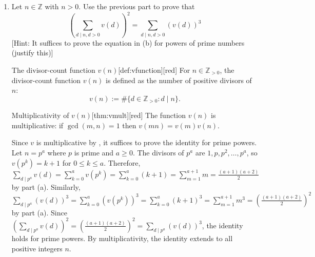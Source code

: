 \begin{enumerate}
\begin{enumerate}
    \item Let $n \in \mathbb{Z}$ with $n>0$. Use the previous part to prove that
    $$
    \left(\sum_{d \mid n, d>0} v(d)\right)^2=\sum_{d \mid n, d>0}(v(d))^3
    $$
    [Hint: It suffices to prove the equation in (b) for powers of prime numbers (justify this)]
    \begin{define}{The divisor-count function $v(n)$}[def:vfunction][red]
    For $n\in\mathbb{Z}_{>0}$, the divisor-count function $v(n)$ is defined as the number of positive divisors of $n$:
    \[
    v(n):=\#\{d\in\mathbb{Z}_{>0}:d\mid n\}.
    \]
    \end{define}
    \begin{define}{Multiplicativity of $v(n)$}[thm:vmult][red]
    The function $v(n)$ is multiplicative: if $\gcd(m,n)=1$ then $v(mn)=v(m)v(n)$.
    \end{define}
    \begin{subprove}
      Since $v$ is multiplicative by , it suffices to prove the identity for prime powers.
      Let $n=p^a$ where $p$ is prime and $a\geq 0$. The divisors of $p^a$ are $1,p,p^2,\ldots,p^a$, so $v(p^k)=k+1$ for $0\leq k\leq a$.
      Therefore, $\sum_{d\mid p^a} v(d) = \sum_{k=0}^a v(p^k) = \sum_{k=0}^a (k+1) = \sum_{m=1}^{a+1} m = \frac{(a+1)(a+2)}{2}$ by part (a).
      Similarly, $\sum_{d\mid p^a} (v(d))^3 = \sum_{k=0}^a (v(p^k))^3 = \sum_{k=0}^a (k+1)^3 = \sum_{m=1}^{a+1} m^3 = \left(\frac{(a+1)(a+2)}{2}\right)^2$ by part (a).
      Since $\left(\sum_{d\mid p^a} v(d)\right)^2 = \left(\frac{(a+1)(a+2)}{2}\right)^2 = \sum_{d\mid p^a} (v(d))^3$, the identity holds for prime powers.
      By multiplicativity, the identity extends to all positive integers $n$.
    \end{subprove}
  \end{enumerate}


\end{enumerate}
